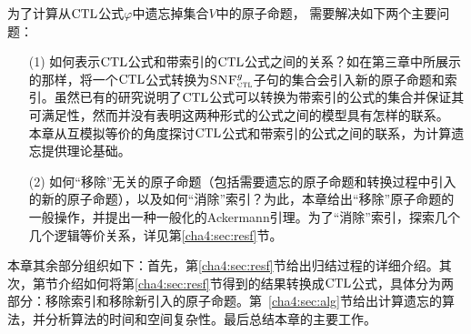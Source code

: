为了计算从$\textrm{CTL}$公式$\varphi$中遗忘掉集合$V$中的原子命题，
需要解决如下两个主要问题：
\begin{itemize}
	\item[(1)] 如何表示$\textrm{CTL}$公式和带索引的$\textrm{CTL}$公式之间的关系？如在第三章中所展示的那样，将一个$\textrm{CTL}$公式转换为${\textsc{SNF}_{\textsc{ctl}}^g}$子句的集合会引入新的原子命题和索引。虽然已有的研究说明了$\textrm{CTL}$公式可以转换为带索引的公式的集合并保证其可满足性，然而并没有表明这两种形式的公式之间的模型具有怎样的联系。
	本章从互模拟等价的角度探讨$\textrm{CTL}$公式和带索引的公式之间的联系，为计算遗忘提供理论基础。
	\item[(2)] 如何“移除”无关的原子命题（包括需要遗忘的原子命题和转换过程中引入的新的原子命题），以及如何“消除”索引？为此，本章给出“移除”原子命题的一般操作，并提出一种一般化的Ackermann引理。为了“消除”索引，探索几个几个逻辑等价关系，详见第\ref{cha4:sec:resf}节。
\end{itemize}

本章其余部分组织如下：首先，第\ref{cha4:sec:resf}节给出归结过程的详细介绍。其次，第\label{cha4:sec:reIndex}节介绍如何将第\ref{cha4:sec:resf}节得到的结果转换成$\textrm{CTL}$公式，具体分为两部分：移除索引和移除新引入的原子命题。第~\ref{cha4:sec:alg}节给出计算遗忘的算法，并分析算法的时间和空间复杂性。最后总结本章的主要工作。



